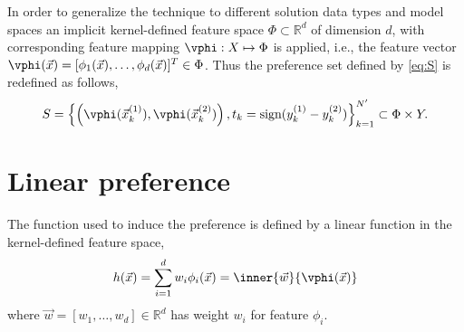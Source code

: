 In order to generalize the technique to different solution data types and model spaces an implicit kernel-defined feature space $\Phi\subset\mathbb{R}^d$ of dimension $d$, with corresponding feature mapping $\vphi:X\mapsto\Phi$ is applied, i.e., the feature vector $\vphi(\vec{x})=[\phi_1(\vec{x}),\ldots,\phi_d(\vec{x})]^T\in\Phi$. Thus the preference set defined by \cref{eq:S} is redefined as follows,
\begin{equation}
	S = \left\{\left(\vphi(\vec{x}_k^{(1)}), \vphi(\vec{x}_k^{(2)})\right),t_k=\text{sign}(y_k^{(1)} - y_k^{(2)})\right\}_{k=1}^{N'} \subset \Phi \times Y \label{eq:Sfeat}.
\end{equation}


\section{Linear preference}\label{sec:ord:linpref}
The function used to induce the preference is defined by a linear function in the kernel-defined feature space,
\begin{equation} 
	h(\vec{x})=\sum_{i=1}^d w_i\phi_i(\vec{x})=\inner{\vec{w}}{\vphi(\vec{x})} \label{eq:linearpref}
\end{equation}
where $\vec{w}=[w_1,\ldots,w_d]\in\mathbb{R}^d$ has weight $w_i$ for feature $\phi_i$.


\begin{comment}
Let $\vec{z}$ denote either $\vphi(\vec{x}_k^{(1)})-\vphi(\vec{x}_k^{(2)})$ with \mbox{$t_k=+1$} or 
$\vphi(\vec{x}_k^{(2)})-\vphi(\vec{x}_k^{(1)})$ with \mbox{$t_k=-1$}, positive or negative example respectively.

Logistic regression learns the optimal parameters $\vec{w}\in\mathbb{R}^d$ determined by solving the following task,
\begin{equation}\label{eq:margin}
	\min_{\vec{w}}\quad \tfrac{1}{2}\inner{\vec{w}}{\vec{w}} + C \sum_{i=1}^{N'} \log\left(1 + e^{-y_i \inner{\vec{w}}{\vec{z}_i}}\right) 
\end{equation}
where $C > 0$ is a penalty parameter, and the negative log-likelihood is due to the fact the given data point $\vec{z}_i$ and weights $\vec{w}$ are assumed to follow the probability model,
\begin{equation}\label{eq:prob}
	\mathcal{P}\big(y=\pm1|\vec{z},\vec{w}\big)=\frac{1}{1+e^{-y\inner{\vec{w}}{\vec{z}_i}}}.
\end{equation}
The logistic regression defined in \cref{eq:margin} is solved iteratively, in particular using Trust Region Newton method \citep[cf.][]{Lin08:newtontrustregion}, which generates a sequence $\{\vec{w}^{(k)}\}_{k=1}^\infty$ converging to the optimal solution $\vec{w}^*$ of \cref{eq:margin}.
\end{comment}

